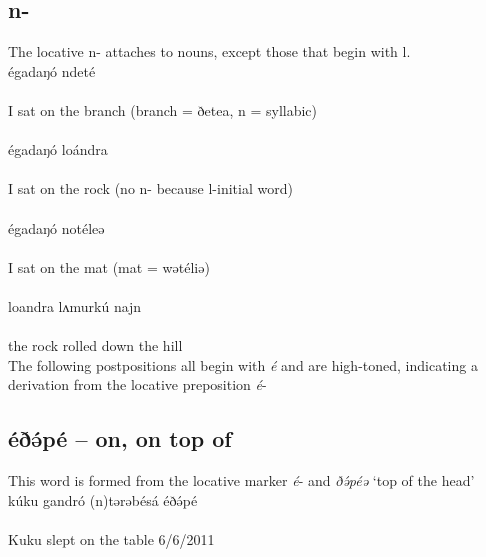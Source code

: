 \subsection{n-}
The locative n- attaches to nouns, except those that begin with l. 
\\
\gll égadaŋó ndeté\\
\\
\trans I sat on the branch	\hfill	(branch = ðetea, n = syllabic)\\
\\\hfill
\gll égadaŋó loándra\\
\\
\trans I sat on the rock	\hfill(no n- because l-initial word)\\
\\
\gll égadaŋó notéleə\\
\\
\trans I sat on the mat	\hfill(mat = wətéliə)\\
\\
\gll loandra lʌmurkú najn\\
\\
\trans the rock rolled down the hill\\

The following postpositions all begin with \textit{é} and are high-toned, indicating a derivation from the locative preposition \textit{é}-

\subsection{éðə́pé – on, on top of}
This word is formed from the locative marker \textit{é}- and \textit{ðə́péə} ‘top of the head’
\\
\gll kúku gandró (n)tərəbésá éðə́pé\\
\\
\trans Kuku slept on the table		\hfill		6/6/2011\\


